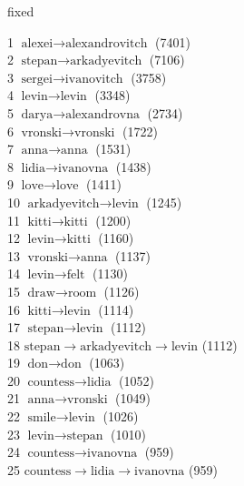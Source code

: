 \begin{appendices}

\iffalse

fixed

     1  $ \text{alexei} \to \text{alexandrovitch} $ (7401) \\
     2  $ \text{stepan} \to \text{arkadyevitch} $ (7106) \\
     3  $ \text{sergei} \to \text{ivanovitch} $ (3758) \\
     4  $ \text{levin} \to \text{levin} $ (3348) \\
     5  $ \text{darya} \to \text{alexandrovna} $ (2734) \\
     6  $ \text{vronski} \to \text{vronski} $ (1722) \\
     7  $ \text{anna} \to \text{anna} $ (1531) \\
     8  $ \text{lidia} \to \text{ivanovna} $ (1438) \\
     9  $ \text{love} \to \text{love} $ (1411) \\
    10  $ \text{arkadyevitch} \to \text{levin} $ (1245) \\
    11  $ \text{kitti} \to \text{kitti} $ (1200) \\
    12  $ \text{levin} \to \text{kitti} $ (1160) \\
    13  $ \text{vronski} \to \text{anna} $ (1137) \\
    14  $ \text{levin} \to \text{felt} $ (1130) \\
    15  $ \text{draw} \to \text{room} $ (1126) \\
    16  $ \text{kitti} \to \text{levin} $ (1114) \\
    17  $ \text{stepan} \to \text{levin} $ (1112) \\
    18  $ \text{stepan} \to \text{arkadyevitch} \to \text{levin} $ (1112) \\
    19  $ \text{don} \to \text{don} $ (1063) \\
    20  $ \text{countess} \to \text{lidia} $ (1052) \\
    21  $ \text{anna} \to \text{vronski} $ (1049) \\
    22  $ \text{smile} \to \text{levin} $ (1026) \\
    23  $ \text{levin} \to \text{stepan} $ (1010) \\
    24  $ \text{countess} \to \text{ivanovna} $ (959) \\
    25  $ \text{countess} \to \text{lidia} \to \text{ivanovna} $ (959) \\

\end{appendices}
